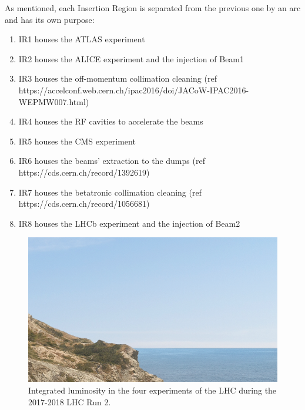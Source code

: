 As mentioned, each Insertion Region is separated from the previous one by an arc and has its own purpose:
\begin{enumerate}
    \item IR1 houses the ATLAS experiment
    \item IR2 houses the ALICE experiment and the injection of Beam1
    \item IR3 houses the off-momentum collimation cleaning (ref https://accelconf.web.cern.ch/ipac2016/doi/JACoW-IPAC2016-WEPMW007.html)
    \item IR4 houses the RF cavities to accelerate the beams
    \item IR5 houses the CMS experiment
    \item IR6 houses the beams' extraction to the dumps (ref https://cds.cern.ch/record/1392619)
    \item IR7 houses the betatronic collimation cleaning (ref https://cds.cern.ch/record/1056681)
    \item IR8 houses the LHCb experiment and the injection of Beam2
\end{enumerate}

\begin{figure}[h]
  \centering
  \includegraphics[width=0.5\linewidth]{Figures/placeholder.png}
  \caption{Integrated luminosity in the four experiments of the LHC during the 2017-2018 LHC Run 2.}
  \label{fig:run_II_luminosities}
\end{figure}


